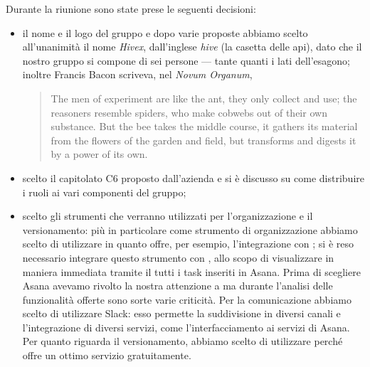 Durante la riunione sono state prese le seguenti decisioni:
\begin{itemize}
\item il nome e il logo del gruppo e dopo varie proposte abbiamo scelto all'unanimità il nome \emph{Hivex}, dall'inglese \emph{hive} (la casetta delle api), dato che il nostro gruppo si compone di sei persone --- tante quanti i lati dell'esagono; inoltre Francis Bacon scriveva, nel \emph{Novum Organum},
\begin{quote}
	The men of experiment are like the ant, they only collect and use; the reasoners resemble spiders, who make cobwebs out of their own substance. But the bee takes the middle course, it gathers its material from the flowers of the garden and field, but transforms and digests it by a power of its own.
\end{quote}

\item scelto il capitolato C6 \proj{} proposto dall'azienda \ZU{} e si è discusso su come distribuire i ruoli ai vari componenti del gruppo;
\item scelto gli strumenti che verranno utilizzati per l'organizzazione e il versionamento: più in particolare come strumento di organizzazione abbiamo scelto di utilizzare  in quanto offre, per esempio, l'integrazione con ; si è reso necessario integrare questo strumento con , allo scopo di visualizzare in maniera immediata tramite il  tutti i task inseriti in Asana. Prima di scegliere Asana avevamo rivolto la nostra attenzione a  ma durante l'analisi delle funzionalità offerte sono sorte varie criticità. Per la comunicazione abbiamo scelto di utilizzare Slack: esso permette la suddivisione in diversi canali e l'integrazione di diversi servizi, come l'interfacciamento ai servizi di Asana. Per quanto riguarda il versionamento, abbiamo scelto di utilizzare   perché offre un ottimo servizio gratuitamente.
\end{itemize}

